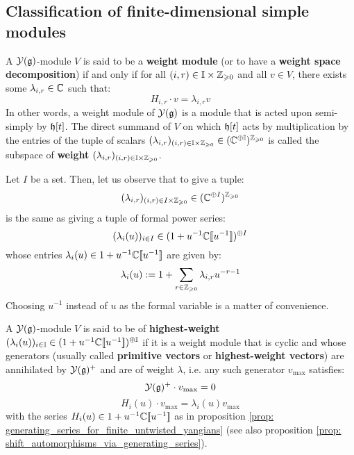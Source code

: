     \subsection{Classification of finite-dimensional simple modules}
        \begin{definition} \label{def: weight_modules_for_finite_untwisted_yangians}
            A $\mathcal{Y}(\mathfrak{g})$-module $V$ is said to be a \textbf{weight module} (or to have a \textbf{weight space decomposition}) if and only if for all $(i, r) \in \simpleroots \x \Z_{\geq 0}$ and all $v \in V$, there exists some $\lambda_{i, r} \in \mathbb{C}$ such that:
                $$H_{i, r} \cdot v = \lambda_{i, r} v$$
            In other words, a weight module of $\mathcal{Y}(\mathfrak{g})$ is a module that is acted upon semi-simply by $\mathfrak{h}[t]$. The direct summand of $V$ on which $\mathfrak{h}[t]$ acts by multiplication by the entries of the tuple of scalars $(\lambda_{i, r})_{(i, r) \in \simpleroots \x \Z_{\geq 0}} \in (\bbC^{\oplus \simpleroots})^{\Z_{\geq 0}}$ is called the subspace of \textbf{weight} $(\lambda_{i, r})_{(i, r) \in \simpleroots \x \Z_{\geq 0}}$.
        \end{definition}
        \begin{remark}
            Let $I$ be a set. Then, let us observe that to give a tuple:
                $$( \lambda_{i, r} )_{(i, r) \in I \x \Z_{\geq 0}} \in (\bbC^{\oplus I})^{\Z_{\geq 0}}$$
            is the same as giving a tuple of formal power series:
                $$( \lambda_i(u) )_{i \in I} \in (1 + u^{-1} \mathbb{C}[\![u^{-1}]\!])^{\oplus I}$$
            whose entries $\lambda_i(u) \in 1 + u^{-1} \mathbb{C}[\![u^{-1}]\!]$ are given by:
                $$\lambda_i(u) := 1 + \sum_{r \in \mathbb{Z}_{\geqslant 0}} \lambda_{i, r} u^{-r - 1}$$
            Choosing $u^{-1}$ instead of $u$ as the formal variable is a matter of convenience.
        \end{remark}
        \begin{definition} \label{def: highest_weight_modules_for_finite_untwisted_yangians}
            A $\mathcal{Y}(\mathfrak{g})$-module $V$ is said to be of \textbf{highest-weight} $( \lambda_i(u) )_{i \in \mathbb{I}} \in (1 + u^{-1} \mathbb{C}[\![u^{-1}]\!])^{\oplus \mathbb{I}}$ if it is a weight module that is cyclic and whose generators (usually called \textbf{primitive vectors} or \textbf{highest-weight vectors}) are annihilated by $\mathcal{Y}(\mathfrak{g})^+$ and are of weight $\lambda$, i.e. any such generator $v_{\max}$ satisfies:
                $$\mathcal{Y}(\mathfrak{g})^+ \cdot v_{\max} = 0$$
                $$H_i(u) \cdot v_{\max} = \lambda_i(u) v_{\max}$$
            with the series $H_i(u) \in 1 + u^{-1} \mathbb{C}[\![u^{-1}]\!]$ as in proposition \ref{prop: generating_series_for_finite_untwisted_yangians} (see also proposition \ref{prop: shift_automorphisms_via_generating_series}).
        \end{definition}

